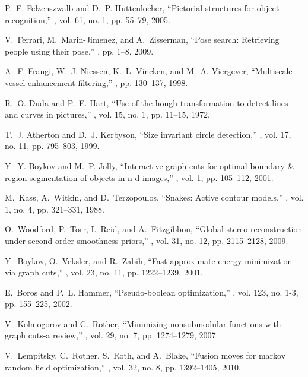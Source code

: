 \documentclass{article}
\begin{document}
{\begin{thebibliography}{9}
P.~F. Felzenszwalb and D.~P. Huttenlocher,
\newblock ``Pictorial structures for object recognition,''
, vol. 61, no. 1, pp. 55--79, 2005.

V.~Ferrari, M.~Marin-Jimenez, and A.~Zisserman,
\newblock ``Pose search: Retrieving people using their pose,''
, pp. 1--8, 2009.

\newpage

A.~F. Frangi, W.~J. Niessen, K.~L. Vincken, and M.~A. Viergever,
\newblock ``Multiscale vessel enhancement filtering,''
, pp. 130--137, 1998.

R.~O. Duda and P.~E. Hart,
\newblock ``Use of the hough transformation to detect lines and curves in pictures,''
, vol. 15, no. 1, pp. 11--15, 1972.

T.~J. Atherton and D.~J. Kerbyson,
\newblock ``Size invariant circle detection,''
, vol. 17, no. 11, pp. 795--803, 1999.

Y.~Y. Boykov and M.~P. Jolly,
\newblock ``Interactive graph cuts for optimal boundary \& region segmentation of objects in n-d images,''
, vol. 1, pp. 105--112, 2001.

M.~Kass, A.~Witkin, and D.~Terzopoulos,
\newblock ``Snakes: Active contour models,''
, vol. 1, no. 4, pp. 321--331, 1988.

O.~Woodford, P.~Torr, I.~Reid, and A.~Fitzgibbon,
\newblock ``Global stereo reconstruction under second-order smoothness priors,''
, vol. 31, no. 12, pp. 2115--2128, 2009.

Y.~Boykov, O.~Veksler, and R.~Zabih,
\newblock ``Fast approximate energy minimization via graph cuts,''
, vol. 23, no. 11, pp. 1222--1239, 2001.

E.~Boros and P.~L. Hammer,
\newblock ``Pseudo-boolean optimization,''
, vol. 123, no. 1-3, pp. 155--225, 2002.

V.~Kolmogorov and C.~Rother,
\newblock ``Minimizing nonsubmodular functions with graph cuts-a review,''
, vol. 29, no. 7, pp. 1274--1279, 2007.

V.~Lempitsky, C.~Rother, S.~Roth, and A.~Blake,
\newblock ``Fusion moves for markov random field optimization,''
, vol. 32, no. 8, pp. 1392--1405, 2010.


\end{thebibliography}}
\end{document}
